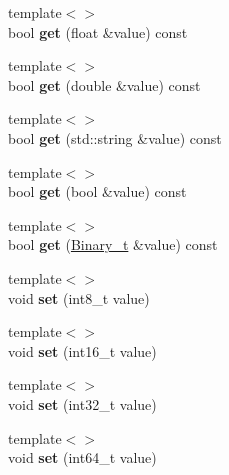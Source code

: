 \begin{DoxyCompactItemize}
{\footnotesize template$<$$>$ }\\bool {\bfseries get} (float \&value) const
\item 
\mbox{\label{classsf_1_1Data_a44bdd204fb298ff67e235ccba8e91e55}} 
{\footnotesize template$<$$>$ }\\bool {\bfseries get} (double \&value) const
\item 
\mbox{\label{classsf_1_1Data_ae861d8b7fe6500a3e74f2315d3b3f8b5}} 
{\footnotesize template$<$$>$ }\\bool {\bfseries get} (std\+::string \&value) const
\item 
\mbox{\label{classsf_1_1Data_a3ac746564c03e46ddf45e5b42798cdaf}} 
{\footnotesize template$<$$>$ }\\bool {\bfseries get} (bool \&value) const
\item 
\mbox{\label{classsf_1_1Data_a708c70ee2ba6fd208eee63e2d0ca4d5b}} 
{\footnotesize template$<$$>$ }\\bool {\bfseries get} (\hyperlink{namespacesf_a3cfcc379b8afaf098c4e1aa67ef92186}{Binary\+\_\+t} \&value) const
\item 
\mbox{\label{classsf_1_1Data_a25211c3c2119b7b9acf89f83e0a62c72}} 
{\footnotesize template$<$$>$ }\\void {\bfseries set} (int8\+\_\+t value)
\item 
\mbox{\label{classsf_1_1Data_af3b3831b4fadbea4df41cc911e47409a}} 
{\footnotesize template$<$$>$ }\\void {\bfseries set} (int16\+\_\+t value)
\item 
\mbox{\label{classsf_1_1Data_ac0700ab9f1118d88cbe2754057102b02}} 
{\footnotesize template$<$$>$ }\\void {\bfseries set} (int32\+\_\+t value)
\item 
\mbox{\label{classsf_1_1Data_a8ea74f142ca1a1e68fc72d33b336a8f3}} 
{\footnotesize template$<$$>$ }\\void {\bfseries set} (int64\+\_\+t value)
\item 
\mbox{\label{classsf_1_1Data_a619aebd253875a352e3cdaf5eb3dd163}} 

\end{DoxyCompactItemize}
